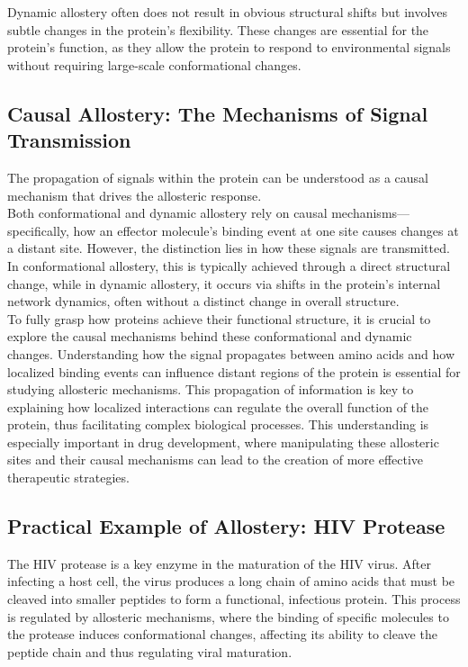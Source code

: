 \documentclass[English, Lau, oneside]{sapthesis}
\begin{document}
Dynamic allostery often does not result in obvious structural shifts but involves subtle changes in the protein's flexibility. These changes are essential for the protein’s function, as they allow the protein to respond to environmental signals without requiring large-scale conformational changes.

\subsection{Causal Allostery: The Mechanisms of Signal Transmission}  
\noindent The propagation of signals within the protein can be understood as a causal mechanism that drives the allosteric response.\\
Both conformational and dynamic allostery rely on causal mechanisms—specifically, how an effector molecule's binding event at one site causes changes at a distant site. However, the distinction lies in how these signals are transmitted.\\
In conformational allostery, this is typically achieved through a direct structural change, while in dynamic allostery, it occurs via shifts in the protein's internal network dynamics, often without a distinct change in overall structure.\\
To fully grasp how proteins achieve their functional structure, it is crucial to explore the causal mechanisms behind these conformational and dynamic changes. Understanding how the signal propagates between amino acids and how localized binding events can influence distant regions of the protein is essential for studying allosteric mechanisms. This propagation of information is key to explaining how localized interactions can regulate the overall function of the protein, thus facilitating complex biological processes.
This understanding is especially important in drug development, where manipulating these allosteric sites and their causal mechanisms can lead to the creation of more effective therapeutic strategies.

\newpage

\subsection{Practical Example of Allostery: HIV Protease}  
\noindent The HIV protease is a key enzyme in the maturation of the HIV virus. After infecting a host cell, the virus produces a long chain of amino acids that must be cleaved into smaller peptides to form a functional, infectious protein. This process is regulated by allosteric mechanisms, where the binding of specific molecules to the protease induces conformational changes, affecting its ability to cleave the peptide chain and thus regulating viral maturation.
\end{document}
